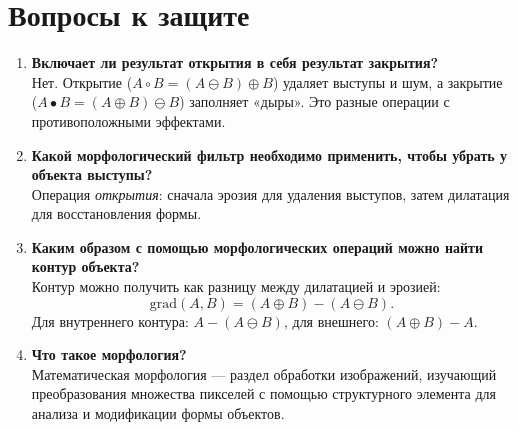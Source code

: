 \documentclass[a4paper,12pt]{article}
\begin{document}
\section{Вопросы к защите}
\begin{enumerate}
    \item \textbf{Включает ли результат открытия в себя результат закрытия?}\\[0.3em]
    Нет. Открытие (\(A\circ B = (A\ominus B)\oplus B\)) удаляет выступы и шум, а закрытие (\(A\bullet B = (A\oplus B)\ominus B\)) заполняет «дыры». Это разные операции с противоположными эффектами.

    \item \textbf{Какой морфологический фильтр необходимо применить, чтобы убрать у объекта выступы?}\\[0.3em]
    Операция \emph{открытия}: сначала эрозия для удаления выступов, затем дилатация для восстановления формы.

    \item \textbf{Каким образом с помощью морфологических операций можно найти контур объекта?} \\[0.3em]
    Контур можно получить как разницу между дилатацией и эрозией:  
    \[
      \mathrm{grad}(A,B) = (A\oplus B) - (A\ominus B).
    \]
    Для внутреннего контура: \(A - (A\ominus B)\), для внешнего: \((A\oplus B) - A\).
  

    \item \textbf{Что такое морфология?} \\[0.3em]
    Математическая морфология — раздел обработки изображений, изучающий преобразования множества пикселей с помощью структурного элемента для анализа и модификации формы объектов.
\end{enumerate}
\end{document}
